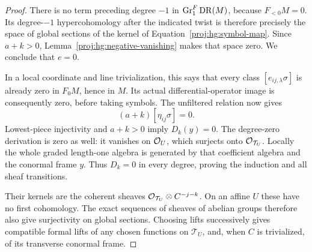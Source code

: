 \begin{proof}
There is no term preceding degree \(-1\) in
\(\operatorname{Gr}^F_1\operatorname{DR}(M)\), because \(F_{<0}M=0\).  Its degree-\(-1\)
hypercohomology after the indicated twist is therefore precisely
the space of global sections of the kernel of
Equation~\eqref{proj:hg:symbol-map}.  Since \(a+k>0\),
Lemma~\ref{proj:hg:negative-vanishing} makes that space zero.
We conclude that \(e=0\).

In a local coordinate and line trivialization, this says that
every class \([e_{ij,\lambda}\sigma]\) is already zero in
\(F_0M\), hence in \(M\).  Its actual differential-operator image
is consequently zero, before taking symbols.  The unfiltered
relation now gives
\[
 (a+k)[\eta_{ij}\sigma]=0.
\]
Lowest-piece injectivity and \(a+k>0\) imply \(D_k(y)=0\).
The degree-zero derivation is zero as well: it vanishes on
\(\mathcal{O}_U\), which surjects onto \(\mathcal{O}_{\mathcal T_U}\).
Locally the whole graded length-one algebra is generated by
that coefficient algebra and the conormal frame \(y\).
Thus \(D_k=0\) in every degree, proving the induction and all
sheaf transitions.

Their kernels are the coherent sheaves
\(\mathcal{O}_{\mathcal T_U}\otimes C^{-j-k}\).  On an affine \(U\)
these have no first cohomology.  The exact sequences of sheaves
of abelian groups therefore also give surjectivity on global
sections.  Choosing lifts successively gives compatible formal
lifts of any chosen functions on \(\mathcal T_U\), and, when
\(C\) is trivialized, of its transverse conormal frame.
\end{proof}
